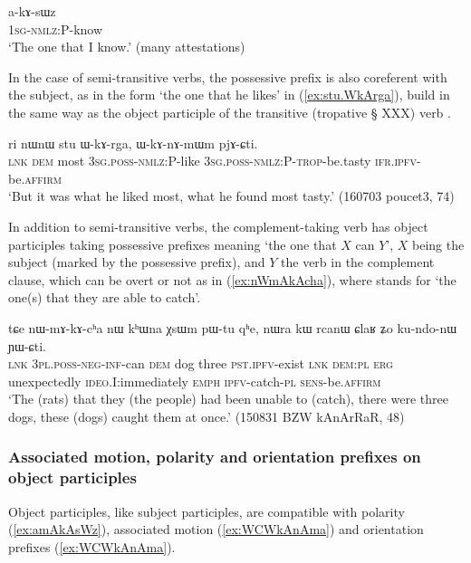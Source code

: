   \begin{exe}
\ex \label{ex:akAsWz}
\gll a-kɤ-sɯz    \\
   \textsc{1sg-nmlz}:P-know \\
 \glt  `The one that I know.' (many attestations)
 \end{exe}

In the case of semi-transitive verbs, the possessive prefix is also coreferent with the subject, as in the form  `the one that he likes' in (\ref{ex:stu.WkArga}), build in the same way as the object participle of the transitive (tropative § XXX) verb .

\begin{exe}
\ex \label{ex:stu.WkArga}
\gll ri nɯnɯ stu ɯ-kɤ-rga, ɯ-kɤ-nɤ-mɯm pjɤ-ɕti. \\
\textsc{lnk} \textsc{dem}  most \textsc{3sg}.\textsc{poss}-\textsc{nmlz}:P-like \textsc{3sg}.\textsc{poss}-\textsc{nmlz}:P-\textsc{trop}-be.tasty \textsc{ifr}.\textsc{ipfv}-be.\textsc{affirm} \\
\glt `But it was what he liked most, what he found most tasty.' (160703 poucet3, 74)
\end{exe}

In addition to semi-transitive verbs, the complement-taking verb  has object participles taking possessive prefixes meaning `the one that $X$ can $Y$', $X$ being the subject (marked by the possessive prefix), and $Y$ the verb in the complement clause, which can be overt or not as in (\ref{ex:nWmAkAcha}), where  stands for  `the one(s) that they are able to catch'.
 
\begin{exe}
\ex  \label{ex:nWmAkAcha}
\gll tɕe nɯ-mɤ-kɤ-cʰa nɯ kʰɯna χsɯm pɯ-tu qʰe, nɯra kɯ rcanɯ ɕlaʁ ʑo ku-ndo-nɯ ɲɯ-ɕti. \\
\textsc{lnk} \textsc{3pl}.\textsc{poss}-\textsc{neg}-\textsc{inf}-can \textsc{dem} dog three \textsc{pst}.\textsc{ipfv}-exist \textsc{lnk} \textsc{dem}:\textsc{pl} \textsc{erg} unexpectedly \textsc{ideo}.I:immediately \textsc{emph} \textsc{ipfv}-catch-\textsc{pl} \textsc{sens}-be.\textsc{affirm} \\
\glt `The (rats) that they (the people) had been unable to (catch), there were three dogs, these (dogs) caught them at once.' (150831 BZW kAnArRaR, 48)
\end{exe}

\subsubsection{Associated motion, polarity and orientation prefixes on object participles}  \label{sec:object.participle.other.prefixes}
Object participles, like subject participles, are compatible with polarity (\ref{ex:amAkAsWz}), associated motion (\ref{ex:WCWkAnAma}) and orientation prefixes (\ref{ex:WCWkAnAma}).

